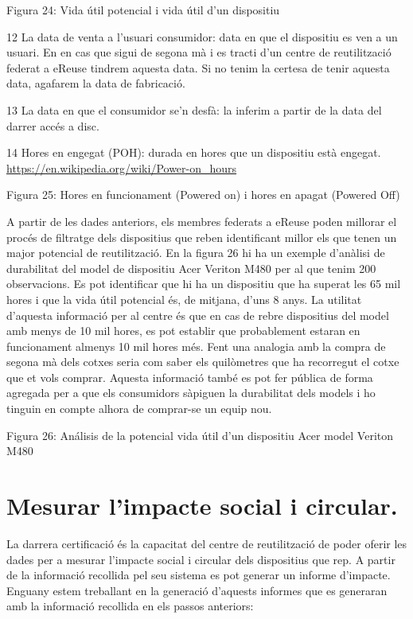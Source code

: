 \documentclass[
]{book}
\begin{document}
Figura 24: Vida útil potencial i vida útil d'un dispositiu

12 La data de venta a l'usuari consumidor: data en que el dispositiu es ven a un usuari. En en cas que sigui de segona mà i es tracti d'un centre de reutilització federat a eReuse tindrem aquesta data. Si no tenim la certesa de tenir aquesta data, agafarem la data de fabricació.

13 La data en que el consumidor se'n desfà: la inferim a partir de la data del darrer accés a disc.

14 Hores en engegat (POH): durada en hores que un dispositiu està engegat. \url{https://en.wikipedia.org/wiki/Power-on_hours}

Figura 25: Hores en funcionament (Powered on) i hores en apagat (Powered Off)

A partir de les dades anteriors, els membres federats a eReuse poden millorar el procés de
filtratge dels dispositius que reben identificant millor els que tenen un major potencial de
reutilització. En la figura 26 hi ha un exemple d'anàlisi de durabilitat del model de dispositiu
Acer Veriton M480 per al que tenim 200 observacions. Es pot identificar que hi ha un dispositiu
que ha superat les 65 mil hores i que la vida útil potencial és, de mitjana, d'uns 8 anys. La
utilitat d'aquesta informació per al centre és que en cas de rebre dispositius del model amb
menys de 10 mil hores, es pot establir que probablement estaran en funcionament almenys 10
mil hores més. Fent una analogia amb la compra de segona mà dels cotxes seria com saber els
quilòmetres que ha recorregut el cotxe que et vols comprar. Aquesta informació també es pot
fer pública de forma agregada per a que els consumidors sàpiguen la durabilitat dels models i
ho tinguin en compte alhora de comprar-se un equip nou.

Figura 26: Análisis de la potencial vida útil d'un dispositiu Acer model Veriton M480

\hypertarget{mesurar-limpacte-social-i-circular.}{%
\section{Mesurar l'impacte social i circular.}\label{mesurar-limpacte-social-i-circular.}}

La darrera certificació és la capacitat del centre de reutilització de poder oferir les dades per a mesurar l'impacte social i circular dels dispositius que rep. A partir de la informació recollida pel seu sistema es pot generar un informe d'impacte. Enguany estem treballant en la generació d'aquests informes que es generaran amb la informació recollida en els passos anteriors:
\end{document}
